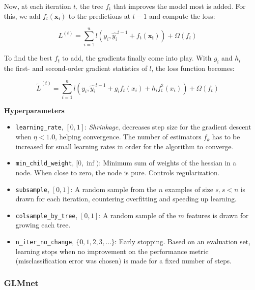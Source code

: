 \documentclass[
  11pt,
  a4paper,
  DIV=12,captions=tableheading,oneside,titlepage]{scrbook}
\providecommand{\tightlist}{%
  \setlength{\itemsep}{0pt}\setlength{\parskip}{0pt}}
\begin{document}
Now, at each iteration \(t\), the tree \(f_t\) that improves the model most is added. For this, we add \(f_t(\mathbf{x_i})\) to the predictions at \(t-1\) and compute the loss:

\begin{equation}
L^{(t)} = \sum_{i=1}^n l(y_i, \hat{y_i}^{t-1} + f_t(\mathbf{x_i})) +\Omega(f_t)
\label{eq:gbm-iterate}
\end{equation}

To find the best \(f_t\) to add, the gradients finally come into play. With \(g_i\) and \(h_i\) the first- and second-order gradient statistics of \(l\), the loss function becomes:

\begin{equation}
\tilde{L}^{(t)} = \sum_{i=1}^n l(y_i, \hat{y_i}^{t-1} + g_if_t(x_i) + h_i f_t^2(x_i)) +\Omega(f_t)
\label{eq:gbm-grad}
\end{equation}

\textbf{Hyperparameters}

\begin{itemize}
\tightlist
\item
  \texttt{learning\_rate}, \([0, 1]\): \emph{Shrinkage}, decreases step size for the gradient descent when \(\eta < 1.0\), helping convergence. The number of estimators \(f_k\) has to be increased for small learning rates in order for the algorithm to converge.
\item
  \texttt{min\_child\_weight}, \([0, \inf)\): Minimum sum of weights of the hessian in a node. When close to zero, the node is pure. Controls regularization.
\item
  \texttt{subsample}, \([0, 1]\): A random sample from the \(n\) examples of size \(s, s < n\) is drawn for each iteration, countering overfitting and speeding up learning.
\item
  \texttt{colsample\_by\_tree}, \([0, 1]\): A random sample of the \(m\) features is drawn for growing each tree.
\item
  \texttt{n\_iter\_no\_change}, \(\{0,1,2,3, \ldots\}\): Early stopping. Based on an evaluation set, learning stops when no improvement on the performance metric (misclassification error was chosen) is made for a fixed number of steps.
\end{itemize}

\hypertarget{glmnet}{%
\subsubsection{GLMnet}\label{glmnet}}
\end{document}
